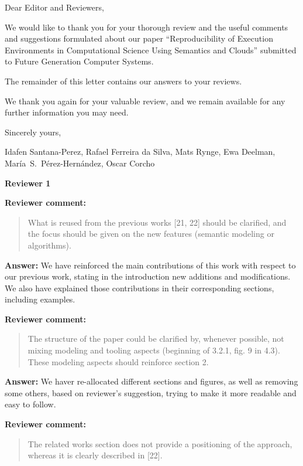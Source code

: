 \documentclass{letter}
\date{Aug 31, 2015}
\newenvironment{review}%
{\textbf{Reviewer comment:}\begin{quote}}%
{\end{quote}}%
\newcommand{\answer}[1]{%
      \textbf{Answer:} #1}
\newcommand{\revised}[1]{\emph{#1}\color{black}}
\begin{document}
\begin{letter}{}

\opening{Dear Editor and Reviewers,}

We would like to thank you for your thorough review and the useful
comments and suggestions formulated about our paper 
``Reproducibility of Execution Environments in Computational Science Using Semantics and Clouds'' 
submitted to Future Generation Computer Systems.

The remainder of this letter contains our answers to your reviews. 

We thank you again for your valuable review, and we remain available for any further information you may need.

\vspace{0.5cm}

Sincerely yours,

\vspace{1cm}

Idafen Santana-Perez, Rafael Ferreira da Silva, Mats Rynge, Ewa Deelman, Mar\'ia~S.~P\'erez-Hern\'andez, Oscar Corcho

\newpage


%
%
\textbf{Reviewer 1}


\begin{review}
What is reused from the previous works [21, 22] should be clarified, and the focus should be given on the new features (semantic modeling or algorithms).
\end{review}

\answer{We have reinforced the main contributions of this work with respect to our previous work, stating in the introduction new additions and modifications. We also have explained those contributions in their corresponding sections, including examples.}



\begin{review}
The structure of the paper could be clarified by, whenever possible, not mixing modeling and tooling aspects (beginning of 3.2.1, fig. 9 in 4.3). These modeling aspects should reinforce section 2.
\end{review}

\answer{We haver re-allocated different sections and figures, as well as removing some others, based on reviewer's suggestion, trying to make it more readable and easy to follow.}


\begin{review}
The related works section does not provide a positioning of the approach, whereas it is clearly described in [22].
\end{review}


\end{letter}
\end{document}
